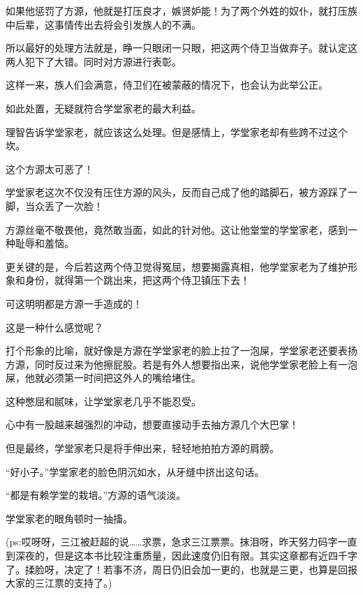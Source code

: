 \begin{this_body}
如果他惩罚了方源，他就是打压良才，嫉贤妒能！为了两个外姓的奴仆，就打压族中后辈，这事情传出去将会引发族人的不满。

所以最好的处理方法就是，睁一只眼闭一只眼，把这两个侍卫当做弃子。就认定这两人犯下了大错。同时对方源进行表彰。

这样一来，族人们会满意，侍卫们在被蒙蔽的情况下，也会认为此举公正。

如此处置，无疑就符合学堂家老的最大利益。

理智告诉学堂家老，就应该这么处理。但是感情上，学堂家老却有些跨不过这个坎。

这个方源太可恶了！

学堂家老这次不仅没有压住方源的风头，反而自己成了他的踏脚石，被方源踩了一脚，当众丢了一次脸！

方源丝毫不敬畏他，竟然敢当面，如此的针对他。这让他堂堂的学堂家老，感到一种耻辱和羞恼。

更关键的是，今后若这两个侍卫觉得冤屈，想要揭露真相，他学堂家老为了维护形象和身份，就得第一个跳出来，把这两个侍卫镇压下去！

可这明明都是方源一手造成的！

这是一种什么感觉呢？

打个形象的比喻，就好像是方源在学堂家老的脸上拉了一泡屎，学堂家老还要表扬方源，同时反过来为他擦屁股。若是有外人想要指出来，说他学堂家老脸上有一泡屎，他就必须第一时间把这外人的嘴给堵住。

这种憋屈和腻味，让学堂家老几乎不能忍受。

心中有一股越来越强烈的冲动，想要直接动手去抽方源几个大巴掌！

但是最终，学堂家老只是将手伸出来，轻轻地拍拍方源的肩膀。

“好小子。”学堂家老的脸色阴沉如水，从牙缝中挤出这句话。

“都是有赖学堂的栽培。”方源的语气淡淡。

学堂家老的眼角顿时一抽搐。

(ps:哎呀呀，三江被赶超的说……求票，急求三江票票。抹泪呀，昨天努力码字一直到深夜的，但是这本书比较注重质量，因此速度仍旧有限。其实这章都有近四千字了。揉脸呀，决定了！若事不济，周日仍旧会加一更的，也就是三更，也算是回报大家的三江票的支持了。)

\end{this_body}

